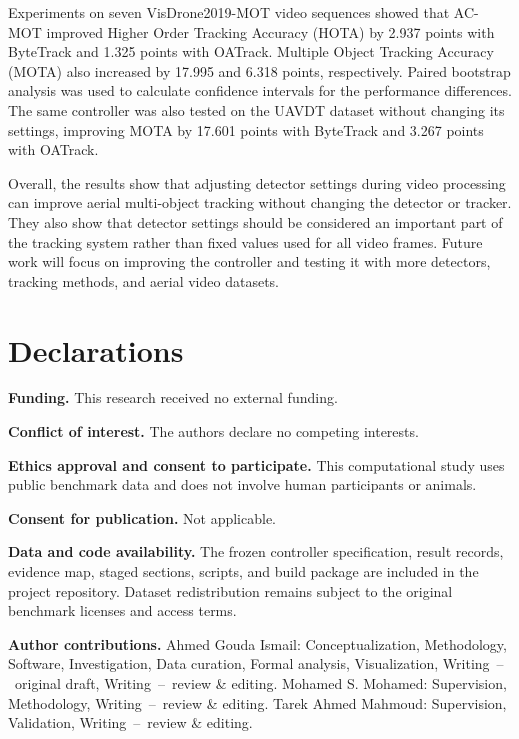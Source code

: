 \documentclass[pdflatex,sn-mathphys-num,iicol]{sn-jnl}
\begin{document}
Experiments on seven VisDrone2019-MOT video sequences showed that AC-MOT
improved Higher Order Tracking Accuracy (HOTA) by 2.937 points with ByteTrack
and 1.325 points with OATrack. Multiple Object Tracking Accuracy (MOTA) also
increased by 17.995 and 6.318 points, respectively. Paired bootstrap analysis
was used to calculate confidence intervals for the performance differences.
The same controller was also tested on the UAVDT dataset without changing its
settings, improving MOTA by 17.601 points with ByteTrack and 3.267 points with
OATrack.

Overall, the results show that adjusting detector settings during video
processing can improve aerial multi-object tracking without changing the
detector or tracker. They also show that detector settings should be
considered an important part of the tracking system rather than fixed values
used for all video frames. Future work will focus on improving the controller
and testing it with more detectors, tracking methods, and aerial video
datasets.

\backmatter

\section*{Declarations}

\noindent\textbf{Funding.} This research received no external funding.

\noindent\textbf{Conflict of interest.} The authors declare no competing interests.

\noindent\textbf{Ethics approval and consent to participate.} This computational study uses public benchmark data and does not involve human participants or animals.

\noindent\textbf{Consent for publication.} Not applicable.

\noindent\textbf{Data and code availability.} The frozen controller specification, result records, evidence map, staged sections, scripts, and build package are included in the project repository. Dataset redistribution remains subject to the original benchmark licenses and access terms.

\noindent\textbf{Author contributions.} Ahmed Gouda Ismail: Conceptualization, Methodology, Software, Investigation, Data curation, Formal analysis, Visualization, Writing~--~original draft, Writing~--~review \& editing. Mohamed S. Mohamed: Supervision, Methodology, Writing~--~review \& editing. Tarek Ahmed Mahmoud: Supervision, Validation, Writing~--~review \& editing.
\end{document}
